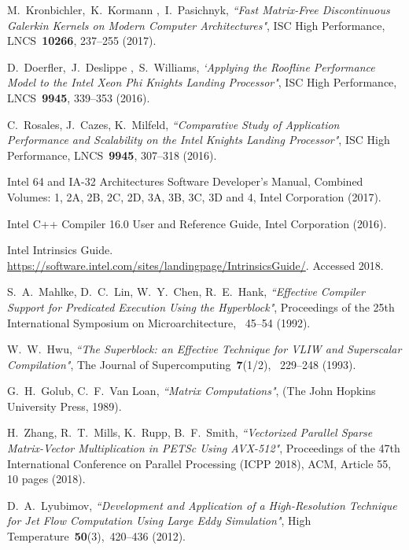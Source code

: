 \documentclass[
11pt,%
tightenlines,%
twoside,%
onecolumn,%
nofloats,%
nobibnotes,%
nofootinbib,%
superscriptaddress,%
noshowpacs,%
centertags]%
{revtex4}
\begin{document}
\begin{thebibliography}{99}
M.~Kronbichler,~K.~Kormann ,~I.~Pasichnyk, {\it ``Fast Matrix-Free Discontinuous Galerkin Kernels on Modern Computer Architectures"}, ISC High Performance, LNCS~{\bf 10266}, 237--255 (2017).

D.~Doerfler,~J.~Deslippe ,~S.~Williams, {\it `Applying the Roofline Performance Model to the Intel Xeon Phi Knights Landing Processor"}, ISC High Performance, LNCS~{\bf 9945}, 339--353 (2016).

C.~Rosales, J.~Cazes, K.~Milfeld, {\it ``Comparative Study of Application Performance and Scalability on the Intel Knights Landing Processor"}, ISC High Performance, LNCS~{\bf 9945}, 307--318 (2016).


Intel 64 and IA-32 Architectures Software Developer's Manual, Combined Volumes: 1, 2A, 2B, 2C, 2D, 3A, 3B, 3C, 3D and 4, Intel Corporation (2017).

Intel C++ Compiler 16.0 User and Reference Guide, Intel Corporation (2016).

Intel Intrinsics Guide. \url{https://software.intel.com/sites/landingpage/IntrinsicsGuide/}. Accessed 2018.

S.~A.~Mahlke, D.~C.~Lin, W.~Y.~Chen, R.~E.~Hank, {\it ``Effective Compiler Support for Predicated Execution Using the Hyperblock"}, Proceedings of the 25th International Symposium on Microarchitecture, ~45--54 (1992).

W.~W.~Hwu, {\it ``The Superblock: an Effective Technique for VLIW and Superscalar Compilation"}, The Journal of Supercomputing~{\bf 7}(1/2), ~229--248 (1993).

G.~H.~Golub, C.~F.~Van Loan, {\it ``Matrix Computations"}, (The John Hopkins University Press, 1989).

H.~Zhang, R.~T.~Mills, K.~Rupp, B.~F.~Smith, {\it ``Vectorized Parallel Sparse Matrix-Vector Multiplication in PETSc Using AVX-512"}, Proceedings of the 47th International Conference on Parallel Processing (ICPP 2018), ACM, Article 55, 10 pages (2018).

D.~A.~Lyubimov, {\it ``Development and Application of a High-Resolution Technique for Jet Flow Computation Using Large Eddy Simulation"}, High Temperature~{\bf 50}(3),~420--436 (2012).


\end{thebibliography}
\end{document}
